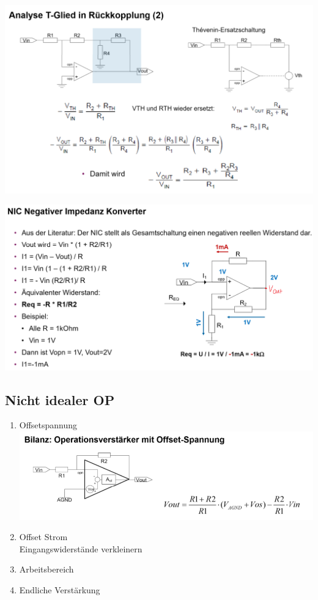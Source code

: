 \includegraphics[width=\linewidth]{Images/opamp_t-glied}

\includegraphics[width=\linewidth]{Images/opamp_nic}


\subsection{Nicht idealer OP}
\begin{enumerate}[nosep]
	\item Offsetspannung\\
	\includegraphics[width=\linewidth]{Images/opamp_offset_spannung}
	
	\item Offset Strom\\
	Eingangswiderstände verkleinern
	\item Arbeitsbereich
	\item Endliche Verstärkung	
\end{enumerate}

